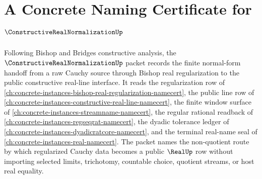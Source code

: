\chapter{A Concrete Naming Certificate for $\ConstructiveRealNormalizationUp$}
\label{ch:concrete-instances-constructive-real-normalization-namecert}

Following Bishop and Bridges constructive analysis, the $\ConstructiveRealNormalizationUp$ packet records the finite normal-form handoff from a raw Cauchy source through Bishop real regularization to the public constructive real-line interface. It reads the regularization row of \autoref{ch:concrete-instances-bishop-real-regularization-namecert}, the public line row of \autoref{ch:concrete-instances-constructive-real-line-namecert}, the finite window surface of \autoref{ch:concrete-instances-streamname-namecert}, the regular rational readback of \autoref{ch:concrete-instances-regseqrat-namecert}, the dyadic tolerance ledger of \autoref{ch:concrete-instances-dyadicratcore-namecert}, and the terminal real-name seal of \autoref{ch:concrete-instances-real-namecert}. The packet names the non-quotient route by which regularized Cauchy data becomes a public $\RealUp$ row without importing selected limits, trichotomy, countable choice, quotient streams, or host real equality.

